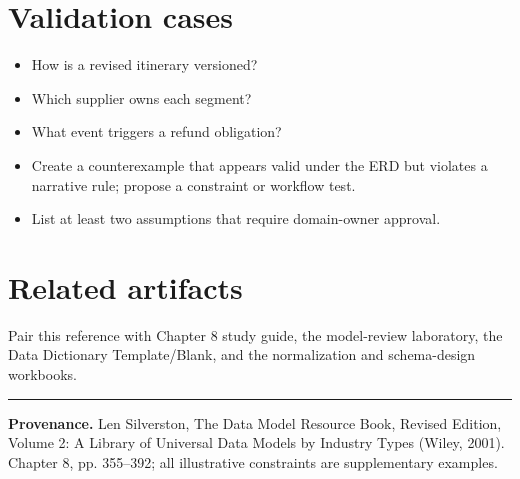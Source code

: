 \documentclass[11pt,letterpaper]{article}
\begin{document}
\section{Validation cases}
\begin{itemize}
\item How is a revised itinerary versioned?
\item Which supplier owns each segment?
\item What event triggers a refund obligation?
\item Create a counterexample that appears valid under the ERD but violates a narrative rule; propose a constraint or workflow test.
\item List at least two assumptions that require domain-owner approval.
\end{itemize}

\section{Related artifacts}
Pair this reference with Chapter 8 study guide, the model-review laboratory, the Data Dictionary Template/Blank, and the normalization and schema-design workbooks.


\vfill
\hrule
{\footnotesize\textbf{Provenance.} Len Silverston, The Data Model Resource Book, Revised Edition, Volume 2: A Library of Universal Data Models by Industry Types (Wiley, 2001). Chapter 8, pp. 355--392; all illustrative constraints are supplementary examples.}
\end{document}
